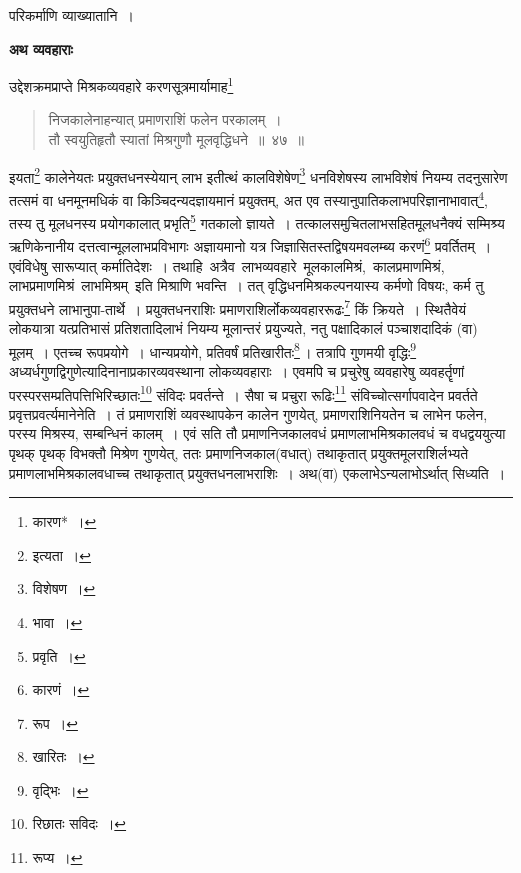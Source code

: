 \documentclass[10pt, openany]{book}
\begin{document}
{{\begin{center}
    
{परिकर्माणि व्याख्यातानि~।}\end{center}

\afterpage{\fancyhead[CO] {\s }}

\newpage

\begin{center}
\textbf{\large अथ व्यवहाराः}
\end{center}
\vspace{0.2cm}

{उद्देशक्रमप्राप्ते मिश्रकव्यवहारे करणसूत्रमार्यामाह\renewcommand{\thefootnote}{\s १}\footnote{\s कारण*~।}\textendash}

 \label{47}
\begin{quote}
    
{\bs निजकालेनाहन्यात् प्रमाणराशिं फलेन परकालम्~। \\
 तौ स्वयुतिहृतौ स्यातां मिश्रगुणौ मूलवृद्धिधने~॥~४७~॥} \end{quote}

{इयता\renewcommand{\thefootnote}{\s २}\footnote{\s इत्यता~।} कालेनेयतः प्रयुक्तधनस्येयान् लाभ इतीत्थं कालविशेषेण\renewcommand{\thefootnote}{\s ३}\footnote{\s *विशेषण~।}
धनविशेषस्य लाभविशेषं नियम्य तदनुसारेण तत्समं वा धनमूनमधिकं वा किञ्चिदन्यदज्ञायमानं
प्रयुक्तम्, अत}
{एव तस्यानुपातिकलाभपरिज्ञानाभावात्\renewcommand{\thefootnote}{\s ४}\footnote{\s *भावा~।}, तस्य तु मूलधनस्य प्रयोगकालात्
प्रभृति\renewcommand{\thefootnote}{\s ५}\footnote{\s प्रवृति~।} गतकालो}
{ज्ञायते~। तत्कालसमुचितलाभसहितमूलधनैक्यं सम्मिश्र्य ऋणिकेनानीय
दत्तत्वान्मूललाभप्रविभागः अज्ञायमानो यत्र जिज्ञासितस्तद्विषयमवलम्ब्य करणं\renewcommand{\thefootnote}{\s ६}\footnote{\s कारणं~।}
प्रवर्तितम्~। एवंविधेषु सारूप्यात् कर्मातिदेशः~। तथाहि \,अत्रैव \,लाभव्यवहारे \,मूलकालमिश्रं, \,कालप्रमाणमिश्रं, \,लाभप्रमाणमिश्रं \,लाभमिश्रम् \,इति मिश्राणि भवन्ति~। तत् वृद्धिधनमिश्रकल्पनयास्य
कर्मणो विषयः, कर्म तु प्रयुक्तधने लाभानुपा-तार्थे~। प्रयुक्तधनराशिः
प्रमाणराशिर्लोकव्यवहाररूढः\renewcommand{\thefootnote}{\s ७}\footnote{\s *रूप~।}  किं क्रियते~।}
{स्थितैवेयं लोकयात्रा यत्प्रतिभासं प्रतिशतादिलाभं नियम्य मूलान्तरं
प्रयुज्यते, नतु पक्षादिकालं}
{पञ्चाशदादिकं (वा) मूलम्~। एतच्च रूपप्रयोगे~। धान्यप्रयोगे, प्रतिवर्षं
प्रतिखारीतः\renewcommand{\thefootnote}{\s ८}\footnote{\s *खारितः~।}\,। तत्रापि}
{गुणमयी वृद्धिः\renewcommand{\thefootnote}{\s ९}\footnote{\s वृद्भिः~।} अध्यर्धगुणद्विगुणेत्यादिनानाप्रकारव्यवस्थाना
लोकव्यवहाराः~। एवमपि च प्रचुरेषु}
{व्यवहारेषु व्यवहर्तॄणां परस्परसम्प्रतिपत्तिभिरिच्छातः\renewcommand{\thefootnote}{\s १०}\footnote{\s *रिछातः सविदः~।} संविदः
प्रवर्तन्ते~। सैषा च प्रचुरा रूढिः\renewcommand{\thefootnote}{\s ११}\footnote{\s रूप्य~।}}
{संविच्चोत्सर्गापवादेन प्रवर्तते प्रवृत्तप्रवर्त्यमानेनेति~। तं
प्रमाणराशिं व्यवस्थापकेन कालेन}
{गुणयेत्, प्रमाणराशिनियतेन च लाभेन फलेन, परस्य मिश्रस्य, सम्बन्धिनं
कालम्~। एवं सति तौ}
{प्रमाणनिजकालवधं प्रमाणलाभमिश्रकालवधं च वधद्वययुत्या पृथक् पृथक् विभक्तौ
मिश्रेण}
{गुणयेत्, ततः प्रमाणनिजकाल(वधात्) तथाकृतात् प्रयुक्तमूलराशिर्लभ्यते
प्रमाणलाभमिश्रकालवधाच्च तथाकृतात् प्रयुक्तधनलाभराशिः~। अथ(वा) एकलाभेऽन्यलाभोऽर्थात्
सिध्यति~।}

}}
\end{document}
